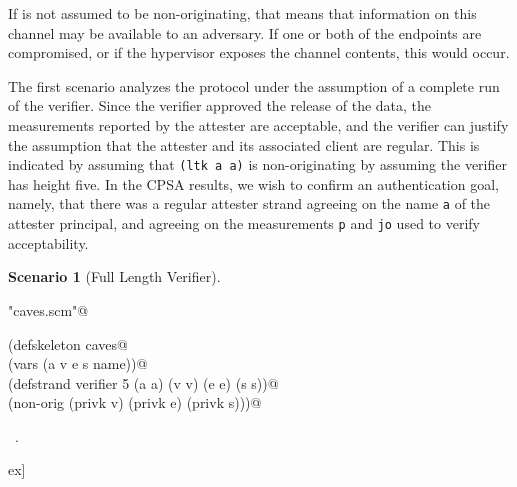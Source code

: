 \documentclass[titlepage,12pt]{article}
\theoremstyle{definition}
\newtheorem{scenario}{Scenario}
\begin{document}
If  is not assumed to be non-originating, that means that
information on this channel may be available to an adversary.  If one
or both of the endpoints are compromised, or if the hypervisor exposes
the channel contents, this would occur.

The first scenario analyzes the protocol under the assumption of a
complete run of the verifier.  Since the verifier approved the release of
the data, the measurements reported by the attester are acceptable,
and the verifier can justify the assumption that the attester and
its associated client are regular. This is
indicated by assuming that \texttt{(ltk a a)} is non-originating by
assuming the verifier has height five.
In the CPSA results, we wish to confirm an authentication goal,
namely, that there was a regular attester strand agreeing on
the name \texttt{a} of the attester principal, and agreeing on the
measurements \texttt{p} and \texttt{jo} used to verify acceptability.

\begin{scenario}[Full Length Verifier]\label{scene:full length verifier}
\begin{flushleft} \small
\begin{minipage}{\linewidth} \label{scrap24}
\verb@"caves.scm"@\nobreak\ {\footnotesize {} }
\vspace{-1ex}
\begin{list}{}{} \item
\mbox{}\verb@(defskeleton caves@\\
\mbox{}\verb@  (vars (a v e s name))@\\
\mbox{}\verb@  (defstrand verifier 5 (a a) (v v) (e e) (s s))@\\
\mbox{}\verb@  (non-orig (privk v) (privk e) (privk s)))@{\NWsep}
\end{list}
\vspace{-1ex}
\footnotesize\addtolength{\baselineskip}{-1ex}
\begin{list}{}{\setlength{\itemsep}{-\parsep}\setlength{\itemindent}{-\leftmargin}}
\item \NWtxtFileDefBy\ .
\end{list}
\end{minipage}\4ex]
\end{flushleft}
\end{scenario}
\end{document}
